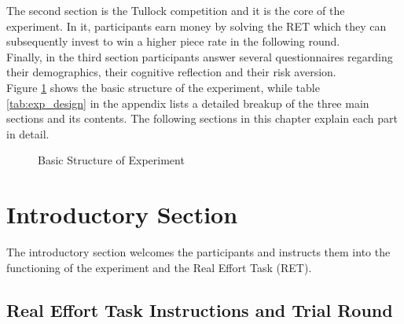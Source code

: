     The second section is the Tullock competition and it is the core of the experiment. In it, participants earn money by solving the RET which they can subsequently invest to win a higher piece rate in the following round.\\
    
    Finally, in the third section participants answer several questionnaires regarding their demographics, their cognitive reflection and their risk aversion.\\
    
    Figure \ref{fig:exp_str} shows the basic structure of the experiment, while table \ref{tab:exp_design} in the appendix lists a detailed breakup of the three main sections and its contents. The following sections in this chapter explain each part in detail.
    
\begin{figure}
\centering
{}

\caption{Basic Structure of Experiment}
\label{fig:exp_str}
\end{figure}
    
    \section{Introductory Section}
    
    The introductory section welcomes the participants and instructs them into the functioning of the experiment and the Real Effort Task (RET).
    
    \subsection{Real Effort Task Instructions and Trial Round}
    
